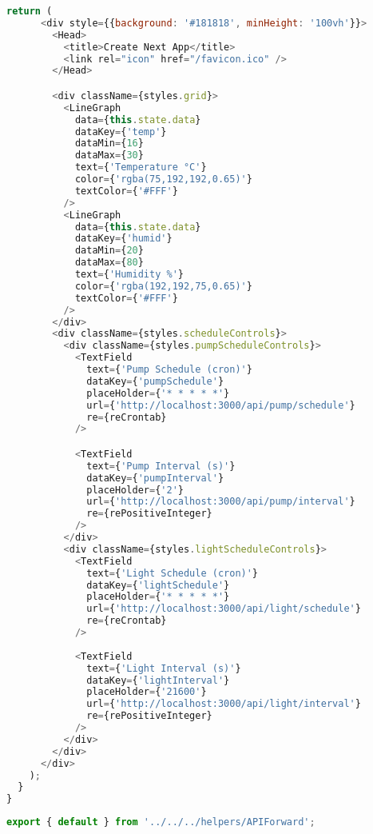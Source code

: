 \documentclass[a4paper,12pt,twoside,openright,titlepage]{book}
\begin{document}
\begin{lstlisting}[title={raspberrypi/ui/pages/index.js}, language=JavaScript]
    return (
      <div style={{background: '#181818', minHeight: '100vh'}}>
        <Head>
          <title>Create Next App</title>
          <link rel="icon" href="/favicon.ico" />
        </Head>

        <div className={styles.grid}>
          <LineGraph
            data={this.state.data}
            dataKey={'temp'}
            dataMin={16}
            dataMax={30}
            text={'Temperature °C'}
            color={'rgba(75,192,192,0.65)'}
            textColor={'#FFF'}
          />
          <LineGraph
            data={this.state.data}
            dataKey={'humid'}
            dataMin={20}
            dataMax={80}
            text={'Humidity %'}
            color={'rgba(192,192,75,0.65)'}
            textColor={'#FFF'}
          />
        </div>
        <div className={styles.scheduleControls}>
          <div className={styles.pumpScheduleControls}>
            <TextField
              text={'Pump Schedule (cron)'}
              dataKey={'pumpSchedule'}
              placeHolder={'* * * * *'}
              url={'http://localhost:3000/api/pump/schedule'}
              re={reCrontab}
            />

            <TextField
              text={'Pump Interval (s)'}
              dataKey={'pumpInterval'}
              placeHolder={'2'}
              url={'http://localhost:3000/api/pump/interval'}
              re={rePositiveInteger}
            />
          </div>
          <div className={styles.lightScheduleControls}>
            <TextField
              text={'Light Schedule (cron)'}
              dataKey={'lightSchedule'}
              placeHolder={'* * * * *'}
              url={'http://localhost:3000/api/light/schedule'}
              re={reCrontab}
            />
            
            <TextField
              text={'Light Interval (s)'}
              dataKey={'lightInterval'}
              placeHolder={'21600'}
              url={'http://localhost:3000/api/light/interval'}
              re={rePositiveInteger}
            />
          </div>
        </div>
      </div>
    );
  }
}
\end{lstlisting}

\bigskip

\begin{lstlisting}[title={raspberrypi/ui/pages/api/light/interval.js}, language=JavaScript]
export { default } from '../../../helpers/APIForward';
\end{lstlisting}

\bigskip
\end{document}
